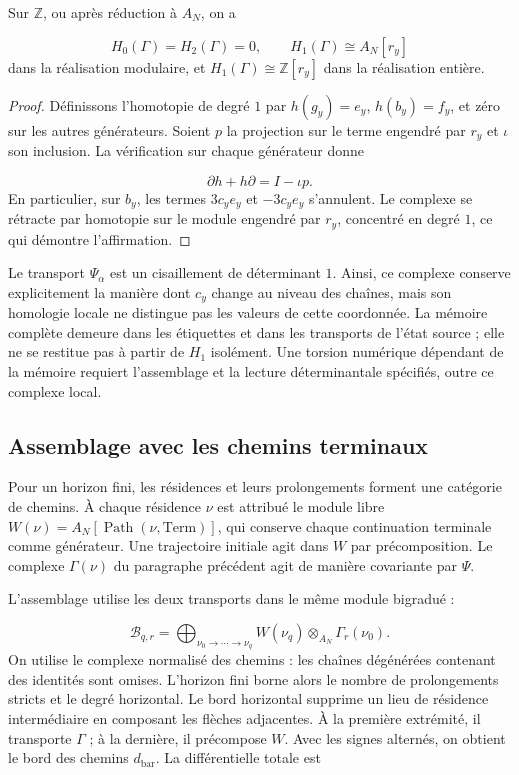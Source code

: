 \begin{proposition}
\label{iv:cont:memoria-homologia}
Sur \(\mathbb Z\), ou après réduction à \(A_N\), on a

\[
H_0(\Gamma)=H_2(\Gamma)=0,
\qquad H_1(\Gamma)\cong A_N[r_y]
\]
dans la réalisation modulaire, et \(H_1(\Gamma)\cong\mathbb Z[r_y]\) dans la réalisation entière.

\end{proposition}
\begin{proof}
Définissons l'homotopie de degré \(1\) par \(h(g_y)=e_y\), \(h(b_y)=f_y\), et zéro sur les autres générateurs. Soient \(p\) la projection sur le terme engendré par \(r_y\) et \(\iota\) son inclusion. La vérification sur chaque générateur donne

\[
\partial h+h\partial=I-\iota p.
\]
En particulier, sur \(b_y\), les termes \(3c_ye_y\) et \(-3c_ye_y\) s'annulent. Le complexe se rétracte par homotopie sur le module engendré par \(r_y\), concentré en degré \(1\), ce qui démontre l'affirmation.
\end{proof}

Le transport \(\Psi_\alpha\) est un cisaillement de déterminant \(1\). Ainsi, ce complexe conserve explicitement la manière dont \(c_y\) change au niveau des chaînes, mais son homologie locale ne distingue pas les valeurs de cette coordonnée. La mémoire complète demeure dans les étiquettes et dans les transports de l'état source ; elle ne se restitue pas à partir de \(H_1\) isolément. Une torsion numérique dépendant de la mémoire requiert l'assemblage et la lecture déterminantale spécifiés, outre ce complexe local.

\subsection{Assemblage avec les chemins terminaux}
\label{iv:cont:ensamblaje}
Pour un horizon fini, les résidences et leurs prolongements forment une catégorie de chemins. À chaque résidence \(\nu\) est attribué le module libre \(W(\nu)=A_N[\operatorname{Path}(\nu,\mathrm{Term})]\), qui conserve chaque continuation terminale comme générateur. Une trajectoire initiale agit dans \(W\) par précomposition. Le complexe \(\Gamma(\nu)\) du paragraphe précédent agit de manière covariante par \(\Psi\).

L'assemblage utilise les deux transports dans le même module bigradué :

\[
\mathcal B_{q,r}=
\bigoplus_{\nu_0\to\cdots\to\nu_q}
W(\nu_q)\otimes_{A_N}\Gamma_r(\nu_0).
\]
On utilise le complexe normalisé des chemins : les chaînes dégénérées contenant des identités sont omises. L'horizon fini borne alors le nombre de prolongements stricts et le degré horizontal. Le bord horizontal supprime un lieu de résidence intermédiaire en composant les flèches adjacentes. À la première extrémité, il transporte \(\Gamma\) ; à la dernière, il précompose \(W\). Avec les signes alternés, on obtient le bord des chemins \(d_{\mathrm{bar}}\). La différentielle totale est

